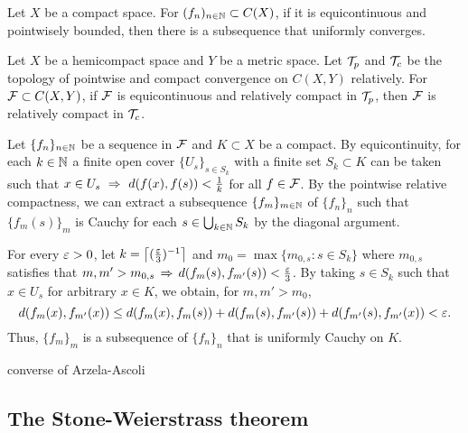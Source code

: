 \documentclass{../crs}
\begin{document}
\begin{thm}
Let $X$ be a compact space.
For $(f_n)_{n\in\mathbb{N}}\subset C(X)$, if it is equicontinuous and pointwisely bounded, then there is a subsequence that uniformly converges.
\end{thm}


\begin{thm}
Let $X$ be a hemicompact space and $Y$ be a metric space.
Let $\mathcal{T}_p$ and $\mathcal{T}_c$ be the topology of pointwise and compact convergence on $C(X,Y)$ relatively.
For $\mathcal{F}\subset C(X,Y)$, if $\mathcal{F}$ is equicontinuous and relatively compact in $\mathcal{T}_p$, then $\mathcal{F}$ is relatively compact in $\mathcal{T}_c$.
\end{thm}
\begin{pf}
Let $\{f_n\}_{n\in\mathbb{N}}$ be a sequence in $\mathcal{F}$ and $K\subset X$ be a compact.
By equicontinuity, for each $k\in\mathbb{N}$ a finite open cover $\{U_s\}_{s\in S_k}$ with a finite set $S_k\subset K$ can be taken such that $x\in U_s\,\,\Rightarrow\,\,d(f(x),f(s))<\frac1k$ for all $f\in\mathcal{F}$.
By the pointwise relative compactness, we can extract a subsequence $\{f_m\}_{m\in\mathbb{N}}$ of $\{f_n\}_n$ such that $\{f_m(s)\}_m$ is Cauchy for each $s\in\bigcup_{k\in\mathbb{N}}S_k$ by the diagonal argument.

For every $\varepsilon>0$, let $k=\left\lceil(\frac{\varepsilon}3)^{-1}\right\rceil$ and $m_0=\max\{m_{0,s}:s\in S_k\}$ where $m_{0,s}$ satisfies that $m,m'>m_{0,s}\,\Rightarrow\, d(f_m(s),f_{m'}(s))<\frac{\varepsilon}3$.
By taking $s\in S_k$ such that $x\in U_s$ for arbitrary $x\in K$, we obtain, for $m,m'>m_0$,
\[d(f_m(x),f_{m'}(x))\le d(f_m(x),f_m(s))+d(f_m(s),f_{m'}(s))+d(f_{m'}(s),f_{m'}(x))<\varepsilon.\]
Thus, $\{f_m\}_m$ is a subsequence of $\{f_n\}_n$ that is uniformly Cauchy on $K$.
\end{pf}


converse of Arzela-Ascoli




\subsection{The Stone-Weierstrass theorem} %
\end{document}
